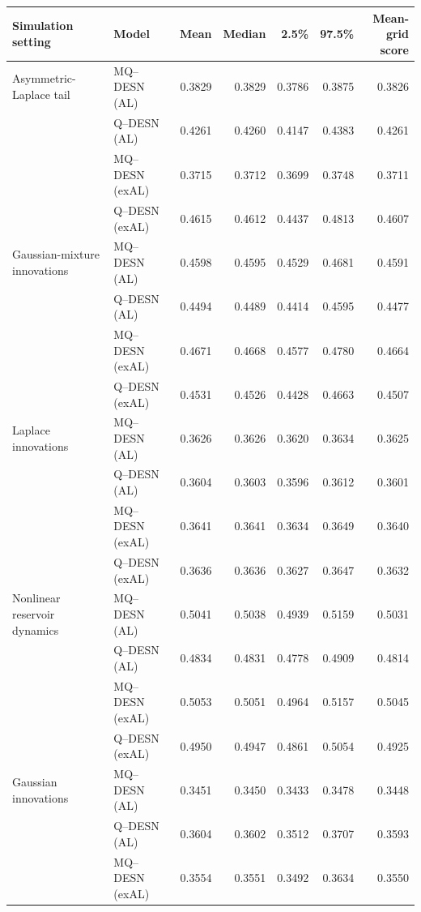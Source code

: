 \begin{table}[p]
\centering
\footnotesize
\setlength{\tabcolsep}{3pt}
\renewcommand{\arraystretch}{1.08}
\begin{tabular}{@{}>{\raggedright\arraybackslash}p{}>{\raggedright\arraybackslash}p{}rrrrr@{}}
\toprule
Simulation setting & Model & Mean & Median & 2.5\% & 97.5\% & \shortstack{Mean-grid\\score} \\
\midrule
Asymmetric-Laplace tail & MQ--DESN (AL) & 0.3829 & 0.3829 & 0.3786 & 0.3875 & 0.3826 \\
 & Q--DESN (AL) & 0.4261 & 0.4260 & 0.4147 & 0.4383 & 0.4261 \\
 & MQ--DESN (exAL) & 0.3715 & 0.3712 & 0.3699 & 0.3748 & 0.3711 \\
 & Q--DESN (exAL) & 0.4615 & 0.4612 & 0.4437 & 0.4813 & 0.4607 \\
\addlinespace[2pt]
Gaussian-mixture innovations & MQ--DESN (AL) & 0.4598 & 0.4595 & 0.4529 & 0.4681 & 0.4591 \\
 & Q--DESN (AL) & 0.4494 & 0.4489 & 0.4414 & 0.4595 & 0.4477 \\
 & MQ--DESN (exAL) & 0.4671 & 0.4668 & 0.4577 & 0.4780 & 0.4664 \\
 & Q--DESN (exAL) & 0.4531 & 0.4526 & 0.4428 & 0.4663 & 0.4507 \\
\addlinespace[2pt]
Laplace innovations & MQ--DESN (AL) & 0.3626 & 0.3626 & 0.3620 & 0.3634 & 0.3625 \\
 & Q--DESN (AL) & 0.3604 & 0.3603 & 0.3596 & 0.3612 & 0.3601 \\
 & MQ--DESN (exAL) & 0.3641 & 0.3641 & 0.3634 & 0.3649 & 0.3640 \\
 & Q--DESN (exAL) & 0.3636 & 0.3636 & 0.3627 & 0.3647 & 0.3632 \\
\addlinespace[2pt]
Nonlinear reservoir dynamics & MQ--DESN (AL) & 0.5041 & 0.5038 & 0.4939 & 0.5159 & 0.5031 \\
 & Q--DESN (AL) & 0.4834 & 0.4831 & 0.4778 & 0.4909 & 0.4814 \\
 & MQ--DESN (exAL) & 0.5053 & 0.5051 & 0.4964 & 0.5157 & 0.5045 \\
 & Q--DESN (exAL) & 0.4950 & 0.4947 & 0.4861 & 0.5054 & 0.4925 \\
\addlinespace[2pt]
Gaussian innovations & MQ--DESN (AL) & 0.3451 & 0.3450 & 0.3433 & 0.3478 & 0.3448 \\
 & Q--DESN (AL) & 0.3604 & 0.3602 & 0.3512 & 0.3707 & 0.3593 \\
 & MQ--DESN (exAL) & 0.3554 & 0.3551 & 0.3492 & 0.3634 & 0.3550 \\

\end{tabular}
\end{table}
